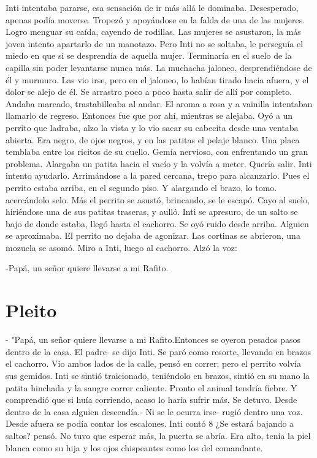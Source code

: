 Inti intentaba pararse, esa sensación de ir más allá le dominaba. Desesperado, apenas podía moverse. Tropezó y apoyándose en la falda de una de las mujeres. Logro menguar su caída, cayendo de rodillas. Las mujeres se asustaron, la más joven intento apartarlo de un manotazo. Pero Inti no se soltaba, le perseguía el miedo en que si se desprendía de aquella mujer. Terminaría en el suelo de la capilla sin poder levantarse nunca más. La muchacha jaloneo, desprendiéndose de él y murmuro. Las vio irse, pero en el jaloneo, 
lo habían tirado hacia afuera, y el dolor se alejo de él. Se arrastro poco a poco hasta salir de allí por completo. Andaba mareado, trastabilleaba al andar. El aroma a rosa y a vainilla intentaban llamarlo de regreso. Entonces fue que por ahí, mientras se alejaba. Oyó a un perrito que ladraba, alzo la vista y lo vio sacar su cabecita desde una ventaba abierta. Era negro, de ojos negros, y en las patitas el pelaje blanco. Una placa temblaba entre los ricitos de su cuello. Gemía nervioso, con enfrentando un gran problema. 
Alargaba un patita hacia el vacío y la volvía a meter. Quería salir. Inti intento ayudarlo. Arrimándose a la pared cercana, trepo para alcanzarlo. Pues el perrito estaba arriba, en el segundo piso. Y alargando el brazo, lo tomo. acercándolo selo. Más el perrito se asustó, brincando, se le escapó. Cayo al suelo, hiriéndose una de sus patitas traseras, y aulló. Inti se apresuro, de un salto se bajo de donde estaba, llegó hasta el cachorro. Se oyó ruido desde arriba. Alguien se aproximaba. El perrito no dejaba de agonizar. 
Las cortinas se abrieron, una mozuela se asomó. Miro a Inti, luego al cachorro. Alzó la voz:

-Papá, un señor quiere llevarse a mi Rafito.



\chapter{Pleito}
- "Papá, un señor quiere llevarse a mi Rafito.Entonces se oyeron pesados pasos dentro de la casa. El padre- se dijo Inti. Se paró como resorte, llevando en brazos el cachorro. Vio ambos lados de la calle, pensó en correr; pero el perrito volvía sus gemidos. Inti se sintió traicionado, teniéndolo en brazos, sintió en su mano la patita hinchada y la sangre correr caliente. Pronto el animal tendría fiebre. Y comprendió que si huía corriendo, acaso lo haría sufrir más. Se detuvo. Desde dentro de la casa alguien descendía.- Ni se le ocurra irse- rugió dentro una voz. Desde afuera se podía contar los escalones. Inti contó 8 ¿Se estará bajando a saltos? pensó. No tuvo que esperar más, la puerta se abría. Era alto, tenía la piel blanca como su hija y los ojos chispeantes como los del comandante.

